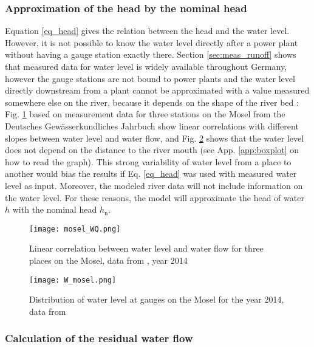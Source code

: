 \subsubsection{Approximation of the head by the nominal head}
\label{sub:approx_h}

Equation \eqref{eq_head} gives the relation between the head and the water level. However, it is not possible to know the water level directly after a power plant without having a gauge station exactly there. Section \ref{sec:meas_runoff} shows that measured data for water level is widely available throughout Germany, however the gauge stations are not bound to power plants and the water level directly downstream from a plant cannot be approximated with a value measured somewhere else on the river, because it depends on the shape of the river bed : Fig. \ref{mosel_WQ} based on measurement data for three stations on the Mosel from the Deutsches Gewässerkundliches Jahrbuch show linear correlations with different slopes between water level and water flow, and Fig. \ref{W_mosel} shows that the water level does not depend on the distance to the river mouth (see App. \ref{app:boxplot} on how to read the graph). \newline
This strong variability of water level from a place to another would bias the results if Eq. \eqref{eq_head} was used with measured water level as input. Moreover, the modeled river data will not include information on the water level. For these reasons, the model will approximate the head of water $h$ with the nominal head $h_\mathrm{n}$.

\begin{figure}[H]
\centering
\texttt{[image: mosel\_WQ.png]}
\caption[Linear correlation between water level and  water flow for three places on the Mosel]{Linear correlation between water level and water flow for three places on the Mosel, data from \cite{dgj}, year 2014}
\label{mosel_WQ}
\end{figure}


\begin{figure}[H]
\centering
\texttt{[image: W\_mosel.png]}
\caption[Distribution of water level at gauges on the Mosel]{Distribution of water level at gauges on the Mosel for the year 2014, data from \cite{dgj}}
\label{W_mosel}
\end{figure}

\subsubsection{Calculation of the residual water flow}
\label{sub:extrapol_dV_res}

